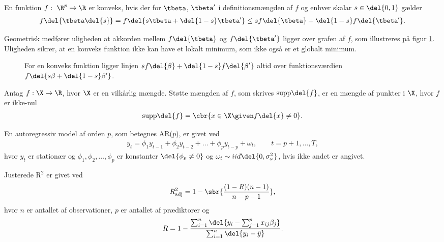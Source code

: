 \begin{defn} \label{defn:konveksfkt}
En funktion \(f: \ \R^p \rightarrow \R\) er konveks, hvis der for \(\tbeta\), \(\tbeta'\) i definitionsmængden af \(f\) og enhver skalar \(s \in \del{0,1}\) gælder
\begin{align*}
f \del{\tbeta \del{s}} = f \del{s \tbeta + \del{1-s} \tbeta'} \leq s f\del{\tbeta} + \del{1-s} f\del{\tbeta'}.
\end{align*}
\end{defn}
Geometrisk medfører uligheden at akkorden mellem \(f \del{\tbeta}\) og  \(f \del{\tbeta'}\) ligger over grafen af \(f\), som illustreres på figur \ref{fig:konveks}.
Uligheden sikrer, at en konveks funktion ikke kan have et lokalt minimum, som ikke også er et globalt minimum.
%
\begin{figure}[H]
\centering
\scalebox{1.2}{}
\caption{For en konveks funktion ligger linjen \(s f \del{\beta} + \del{1-s} f \del{\beta'}\) altid over funktionsværdien \(f \del{s \beta + \del{1-s} \beta'}\).} \label{fig:konveks}
\end{figure}
%
\begin{defn} \label{defn:supp}
Antag \(f: \X \rightarrow \R\), hvor \(\X\) er en vilkårlig mængde.
Støtte mængden af \(f\), som skrives \(\text{supp} \del{f}\), er en mængde af punkter i \(\X\), hvor \(f\) er ikke-nul
\begin{align*}
\text{supp} \del{f} = \cbr{x \in \X \given f \del{x} \neq 0}.
\end{align*}
\end{defn}
%
\begin{defn} \label{def:ar}
En autoregressiv model af orden $p$, som betegnes AR($p$), er givet ved
\begin{align*}
y_t = \phi_1 y_{t-1} + \phi_2 y_{t-2} + \dots + \phi_p y_{t-p} + \omega_t, \qquad t = p+1, \dots, T,  
\end{align*}
hvor $y_t$ er stationær og $\phi_1 , \phi_2, \dots, \phi_p $ er konstanter  $\del{ \phi_p \neq 0}$ og $\omega_t \sim iid\del{0, \sigma_\omega^2}$, hvis ikke andet er angivet.  
\end{defn}

\begin{defn}[Justerede R$^2$] \label{def:adjr2}
Justerede R$^2$ er givet ved
\begin{align*}
R^2_{\text{adj}} = 1 - \sbr{\frac{(1 - R)(n-1)}{n - p -1}},
\end{align*}
hvor $n$ er antallet af observationer, $p$ er antallet af prædiktorer og 
\begin{align*}
R = 1 - \frac{\sum_{i = 1}^n \del{y_i - \sum_{j=1}^px_{ij} \beta_j}}{\sum_{i = 1}^n \del{y_i - \bar{y}}}.
\end{align*}
\end{defn}
 

